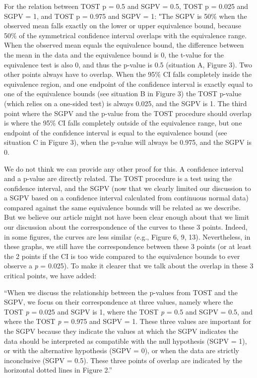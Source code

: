 \documentclass[man]{apa6}
\begin{document}
For the relation between TOST p = 0.5 and SGPV = 0.5, TOST p = 0.025 and SGPV = 1, and TOST p = 0.975 and SGPV = 1: "The SGPV is 50\% when the observed mean falls exactly on the lower or upper equivalence bound, because 50\% of the symmetrical confidence interval overlaps with the equivalence range. When the observed mean equals the equivalence bound, the difference between the mean in the data and the equivalence bound is 0, the t-value for the equivalence test is also 0, and thus the p-value is 0.5 (situation A, Figure 3). Two other points always have to overlap. When the 95\% CI falls completely inside the equivalence region, and one endpoint of the confidence interval is exactly equal to one of the equivalence bounds (see situation B in Figure 3) the TOST p-value (which relies on a one-sided test) is always 0.025, and the SGPV is 1. The third point where the SGPV and the p-value from the TOST procedure should overlap is where the 95\% CI falls completely outside of the equivalence range, but one endpoint of the confidence interval is equal to the equivalence bound (see situation C in Figure 3), when the p-value will always be 0.975, and the SGPV is 0.

We do not think we can provide any other proof for this. A confidence interval and a p-value are directly related. The TOST procedure is a test using the confidence interval, and the SGPV (now that we clearly limited our discussion to a SGPV based on a confidence interval calculated from continuous normal data) compared against the same equivalence bounds will be related as we describe. But we believe our article might not have been clear enough about that we limit our discussion about the correspondence of the curves to these 3 points. Indeed, in some figures, the curves are less similar (e.g., Figure 6, 9, 13). Nevertheless, in these graphs, we still have the correspondence between these 3 points (or at least the 2 points if the CI is too wide compared to the equivalence bounds to ever observe a \emph{p} = 0.025). To make it clearer that we talk about the overlap in these 3 critical points, we have added:

\enquote{When we discuss the relationship between the p-values from TOST and the SGPV, we focus on their correspondence at three values, namely where the TOST \emph{p} = 0.025 and SGPV is 1, where the TOST \emph{p} = 0.5 and SGPV = 0.5, and where the TOST \emph{p} = 0.975 and SGPV = 1. These three values are important for the SGPV because they indicate the values at which the SGPV indicates the data should be interpreted as compatible with the null hypothesis (SGPV = 1), or with the alternative hypothesis (SGPV = 0), or when the data are strictly inconclusive (SGPV = 0.5). These three points of overlap are indicated by the horizontal dotted lines in Figure 2.}
\end{document}
